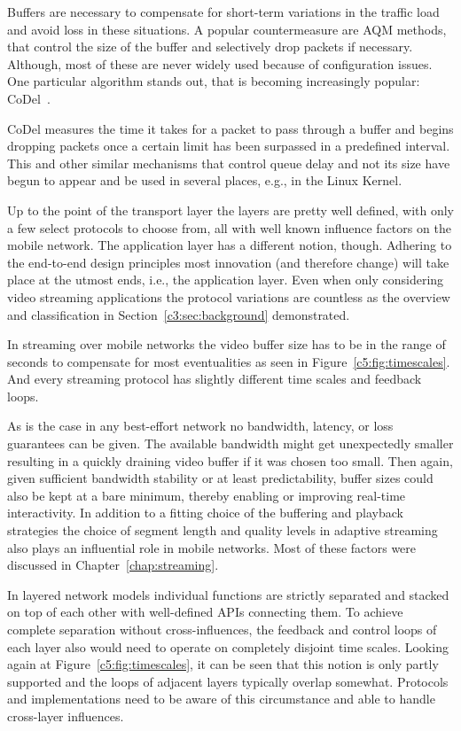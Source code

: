Buffers are necessary to compensate for short-term variations in the traffic load and avoid loss in these situations. A popular countermeasure are \gls{AQM} methods, that control the size of the buffer and selectively drop packets if necessary. Although, most of these are never widely used because of configuration issues. One particular algorithm stands out, that is becoming increasingly popular: CoDel~\cite{Nichols:2012:CQD:2209249.2209264, nichols2014codel}.

CoDel measures the time it takes for a packet to pass through a buffer and begins dropping packets once a certain limit has been surpassed in a predefined interval. This and other similar mechanisms that control queue delay and not its size have begun to appear and be used in several places, e.g., in the Linux Kernel.

Up to the point of the transport layer the layers are pretty well defined, with only a few select protocols to choose from, all with well known influence factors on the mobile network. The application layer has a different notion, though. Adhering to the end-to-end design principles most innovation (and therefore change) will take place at the utmost ends, i.e., the application layer. Even when only considering video streaming applications the protocol variations are countless as the overview and classification in Section~\ref{c3:sec:background} demonstrated. 

In streaming over mobile networks the video buffer size has to be in the range of seconds to compensate for most eventualities as seen in Figure~\ref{c5:fig:timescales}. And every streaming protocol has slightly different time scales and feedback loops.

As is the case in any best-effort network no bandwidth, latency, or loss guarantees can be given. The available bandwidth might get unexpectedly smaller resulting in a quickly draining video buffer if it was chosen too small. Then again, given sufficient bandwidth stability or at least predictability, buffer sizes could also be kept at a bare minimum, thereby enabling or improving real-time interactivity. In addition to a fitting choice of the buffering and playback strategies the choice of segment length and quality levels in adaptive streaming also plays an influential role in mobile networks. Most of these factors were discussed in Chapter~\ref{chap:streaming}.

In layered network models individual functions are strictly separated and stacked on top of each other with well-defined \glspl{API} connecting them. To achieve complete separation without cross-influences, the feedback and control loops of each layer also would need to operate on completely disjoint time scales. Looking again at Figure~\ref{c5:fig:timescales}, it can be seen that this notion is only partly supported and the loops of adjacent layers typically overlap somewhat. Protocols and implementations need to be aware of this circumstance and able to handle cross-layer influences.


